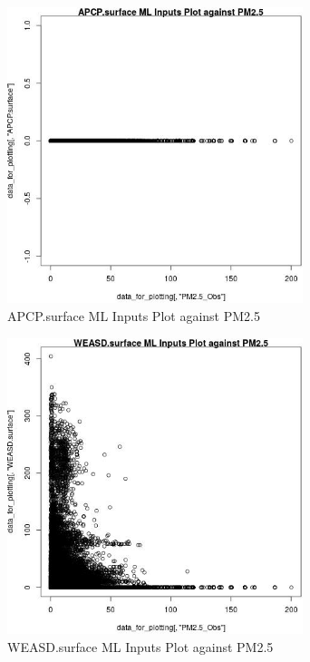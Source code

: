 \begin{figure} 
\centering  
\includegraphics[width=0.77\textwidth]{Code_Outputs/ML_input_report_ML_input_PM25_Step5_part_d_de_duplicated_aves_ML_input_APCPsurfacevPM25_Obs.jpg} 
\caption{\label{fig:ML_input_report_ML_input_PM25_Step5_part_d_de_duplicated_aves_ML_inputAPCPsurfacevPM25_Obs}APCP.surface ML Inputs Plot against PM2.5} 
\end{figure} 
 

\begin{figure} 
\centering  
\includegraphics[width=0.77\textwidth]{Code_Outputs/ML_input_report_ML_input_PM25_Step5_part_d_de_duplicated_aves_ML_input_WEASDsurfacevPM25_Obs.jpg} 
\caption{\label{fig:ML_input_report_ML_input_PM25_Step5_part_d_de_duplicated_aves_ML_inputWEASDsurfacevPM25_Obs}WEASD.surface ML Inputs Plot against PM2.5} 
\end{figure} 
 

